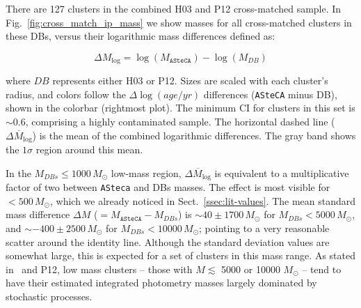 \documentclass[referee]{aa}
\begin{document}
There are 127 clusters in the combined H03 and P12 cross-matched sample.
In Fig.~\ref{fig:cross_match_ip_mass} we show masses for all cross-matched
clusters in these DBs, versus their logarithmic mass differences defined as:

\begin{equation}
\Delta M_{\log} = \log(M_{\mathtt{ASteCA}}) - \log(M_{DB})
\label{eq:log_mass_diffs}
\end{equation}

\noindent where $DB$ represents either H03 or P12.
%
Sizes are scaled with each cluster's radius, and colors follow the
$\Delta \log(age/yr)$ differences (\texttt{ASteCA} minus DB), shown in the
colorbar (rightmost plot). The minimum CI for clusters in this set is
${\sim}0.6$, comprising a highly contaminated sample.
%
The horizontal dashed line ($\overline{\Delta M_{\log}}$) is the mean of the
combined logarithmic differences. The gray band shows the $1\sigma$ region
around this mean.

In the $M_{DBs}{\le}1000\,M_{\odot}$ low-mass region,
$\overline{\Delta M_{\log}}$ is equivalent to a multiplicative factor of two
between \texttt{ASteca} and DBs masses. The effect is most visible for
${<}500\,M_{\odot}$, which we already noticed in Sect.~\ref{ssec:lit-values}.
%
The mean standard mass difference $\Delta M$ (${=}M_{\mathtt{ASteCA}}-M_{DBs}$)
is ${\sim}40{\pm}1700\,M_{\odot}$ for $M_{DBs} {<}5000\,M_{\odot}$,
and ${\sim-}400{\pm}2500\,M_{\odot}$ for $M_{DBs} {<}10000\,M_{\odot}$; pointing
to a very reasonable scatter around the identity line.
%
Although the standard deviation values are somewhat large, this is expected for
a set of clusters in this mass range. As stated in~\cite{Baumgardt_2013} and
P12, low mass clusters -- those with $M{\lesssim}$ 5000 or 10000 $M_{\odot}$ --
tend to have their estimated integrated photometry masses largely dominated by
stochastic processes.
\end{document}
